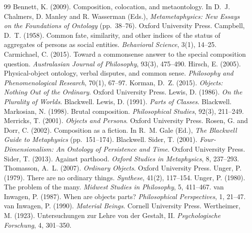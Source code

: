 \documentclass{situationist-preprint}
\begin{document}
\begin{thebibliography}{99}\small
{} Bennett, K. (2009). Composition, colocation, and metaontology. In D.~J. Chalmers, D. Manley and R. Wasserman (Eds.), \emph{Metametaphysics: New Essays on the Foundations of Ontology} (pp.~38--76). Oxford University Press.
 Campbell, D.~T. (1958). Common fate, similarity, and other indices of the status of aggregates of persons as social entities. \emph{Behavioral Science}, 3(1), 14--25.
 Carmichael, C. (2015). Toward a commonsense answer to the special composition question. \emph{Australasian Journal of Philosophy}, 93(3), 475--490.
 Hirsch, E. (2005). Physical-object ontology, verbal disputes, and common sense. \emph{Philosophy and Phenomenological Research}, 70(1), 67--97.
 Korman, D.~Z. (2015). \emph{Objects: Nothing Out of the Ordinary}. Oxford University Press.
 Lewis, D. (1986). \emph{On the Plurality of Worlds}. Blackwell.
 Lewis, D. (1991). \emph{Parts of Classes}. Blackwell.
 Markosian, N. (1998). Brutal composition. \emph{Philosophical Studies}, 92(3), 211--249.
 Merricks, T. (2001). \emph{Objects and Persons}. Oxford University Press.
 Rosen, G. and Dorr, C. (2002). Composition as a fiction. In R.~M. Gale (Ed.), \emph{The Blackwell Guide to Metaphysics} (pp.~151--174). Blackwell.
 Sider, T. (2001). \emph{Four-Dimensionalism: An Ontology of Persistence and Time}. Oxford University Press.
 Sider, T. (2013). Against parthood. \emph{Oxford Studies in Metaphysics}, 8, 237--293.
 Thomasson, A.~L. (2007). \emph{Ordinary Objects}. Oxford University Press.
 Unger, P. (1979). There are no ordinary things. \emph{Synthese}, 41(2), 117--154.
 Unger, P. (1980). The problem of the many. \emph{Midwest Studies in Philosophy}, 5, 411--467.
 van Inwagen, P. (1987). When are objects parts? \emph{Philosophical Perspectives}, 1, 21--47.
 van Inwagen, P. (1990). \emph{Material Beings}. Cornell University Press.
 Wertheimer, M. (1923). Untersuchungen zur Lehre von der Gestalt, II. \emph{Psychologische Forschung}, 4, 301--350.
\end{thebibliography}
\end{document}
